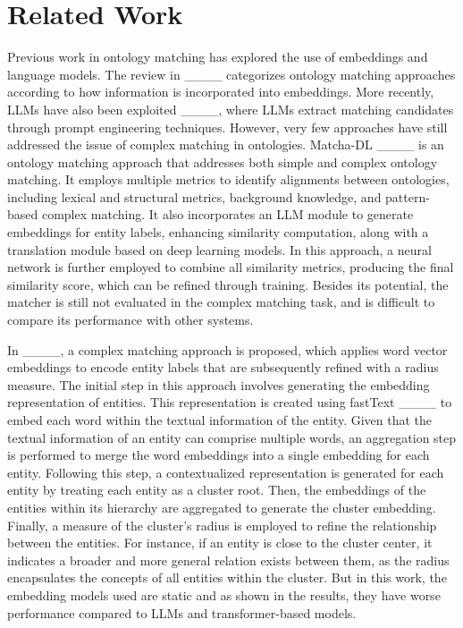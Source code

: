 \section{Related Work}
\label{sec:related_work}

Previous work in ontology matching has explored the use of embeddings and language models. The review in ____ categorizes ontology matching approaches according to how information is incorporated into embeddings. More recently, LLMs have also been exploited ____, where LLMs extract matching candidates through prompt engineering techniques. However, very few approaches have still addressed the issue of complex matching in ontologies. Matcha-DL ____ is an ontology matching approach that addresses both simple and complex ontology matching. It employs multiple metrics to identify alignments between ontologies, including lexical and structural metrics, background knowledge, and pattern-based complex matching. It also incorporates an LLM module to generate embeddings for entity labels, enhancing similarity computation, along with a translation module based on deep learning models. In this approach, a neural network is further employed to combine all similarity metrics, producing the final similarity score, which can be refined through training. Besides its potential, the matcher is still not evaluated in the complex matching task, and is difficult to compare its performance with other systems. 

In ____, a complex matching approach is proposed, which applies word vector embeddings to encode entity labels that are subsequently refined with a radius measure. The initial step in this approach involves generating the embedding representation of entities. This representation is created using fastText ____ to embed each word within the textual information of the entity. Given that the textual information of an entity can comprise multiple words, an aggregation step is performed to merge the word embeddings into a single embedding for each entity. Following this step, a contextualized representation is generated for each entity by treating each entity as a cluster root. Then, the embeddings of the entities within its hierarchy are aggregated to generate the cluster embedding. Finally, a measure of the cluster's radius is employed to refine the relationship between the entities. For instance, if an entity is close to the cluster center, it indicates a broader and more general relation exists between them, as the radius encapsulates the concepts of all entities within the cluster. But in this work, the embedding models used are static and as shown in the results, they have worse performance compared to LLMs and transformer-based models. 

